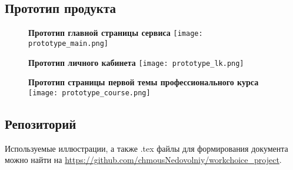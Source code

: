\documentclass[12pt]{article}
\begin{document}
\subsection{Прототип продукта}

\begin{figure}[H]
\textbf{Прототип главной страницы сервиса}
\centering
\texttt{[image: prototype\_main.png]}
\end{figure}

\begin{figure}[H]
\textbf{Прототип личного кабинета}
\centering
\texttt{[image: prototype\_lk.png]}
\end{figure}


\begin{figure}[H]
\textbf{Прототип страницы первой темы профессионального курса}
\centering
\texttt{[image: prototype\_course.png]}
\end{figure}

\subsection{Репозиторий}
Используемые иллюстрации, а также .tex файлы для формирования документа можно найти на
\url{https://github.com/chmousNedovolniy/workchoice_project}. 
\end{document}
